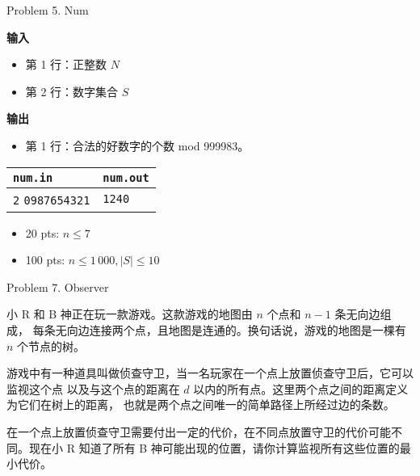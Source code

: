 \documentclass[UTF8]{beamer}
\begin{document}
\begin{frame}{Problem 5. Num}

\textbf{输入}
\begin{itemize}
    \item 第 1 行：正整数 $N$
    \item 第 2 行：数字集合 $S$
\end{itemize}
\textbf{输出}
\begin{itemize}
    \item 第 1 行：合法的好数字的个数 mod 999983。
\end{itemize}

\begin{tabularx}{\textwidth}{|X|X|}
\hline
\texttt{\textbf{num.in}} & \texttt{\textbf{num.out}} \\ \hline
\texttt{2}\newline
\texttt{0987654321}
&
\texttt{1240}
\\ \hline
\end{tabularx}
\newline
\begin{itemize}
    \item 20 pts: $n \leq 7$
    \item 100 pts: $n \leq 1\,000, |S| \leq 10$
\end{itemize}

\end{frame}


\begin{frame}{Problem 7. Observer}

小 R 和 B 神正在玩一款游戏。这款游戏的地图由 $n$ 个点和 $n - 1$ 条无向边组成，
每条无向边连接两个点，且地图是连通的。换句话说，游戏的地图是一棵有 $n$ 个节点的树。

游戏中有一种道具叫做侦查守卫，当一名玩家在一个点上放置侦查守卫后，它可以监视这个点
以及与这个点的距离在 $d$ 以内的所有点。这里两个点之间的距离定义为它们在树上的距离，
也就是两个点之间唯一的简单路径上所经过边的条数。

在一个点上放置侦查守卫需要付出一定的代价，在不同点放置守卫的代价可能不同。现在小 R
知道了所有 B 神可能出现的位置，请你计算监视所有这些位置的最小代价。

\end{frame}
\end{document}
